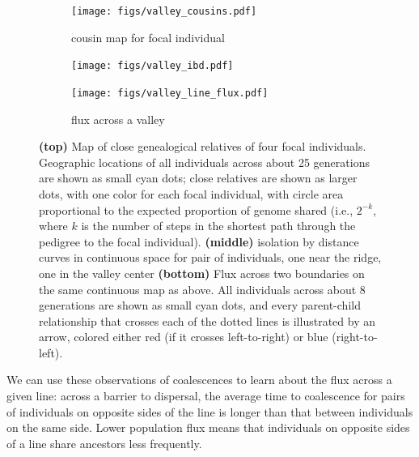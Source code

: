 \documentclass{ar-1col}
\newcommand{\todo}[1]{{\textbf{\color{red}{#1}}}}
\begin{document}
\begin{figure}[ht]
    \centering
    \begin{subfigure}{\textwidth}
        \centering
        \texttt{[image: figs/valley\_cousins.pdf]}
        \caption{cousin map for focal individual}
        \label{cousin_map}
    \end{subfigure}
    \begin{subfigure}{\textwidth}
        \centering
        \texttt{[image: figs/valley\_ibd.pdf]}
        \caption{\todo{ibd map for 2 individuals, one close to barrier, one far away -- TODO: color by focal individual, add more individuals, axis labels}}
        \label{ibd}
    \end{subfigure}
    \begin{subfigure}{\textwidth}
        \centering
        \texttt{[image: figs/valley\_line\_flux.pdf]}
        \caption{flux across a valley}
        \label{valleyflux}
    \end{subfigure}
        \caption{
            \textbf{(top)} Map of close genealogical relatives of four focal individuals.
            Geographic locations of all individuals across about 25 generations are shown as small cyan dots;
            close relatives are shown as larger dots, with one color for each focal individual,
            with circle area proportional to the expected proportion of genome shared
            (i.e., $2^{-k}$, where $k$ is the number of steps in the shortest path through the pedigree to the focal individual).
            \textbf{(middle)}
            isolation by distance curves in continuous space for pair of individuals, 
			one near the ridge, one in the valley center
            \textbf{(bottom)}
            Flux across two boundaries on the same continuous map as above.
            All individuals across about 8 generations are shown as small cyan dots,
            and every parent-child relationship that crosses each of the dotted lines
            is illustrated by an arrow, colored either red (if it crosses left-to-right) or blue (right-to-left).
        }
        \label{dispersal}
\end{figure}



We can use these observations of coalescences to learn about the flux across a given line:
across a barrier to dispersal,
the average time to coalescence for pairs of individuals on opposite sides of the line
is longer than that between individuals on the same side.
Lower population flux means that individuals on opposite sides of a line share ancestors
less frequently.
\end{document}
